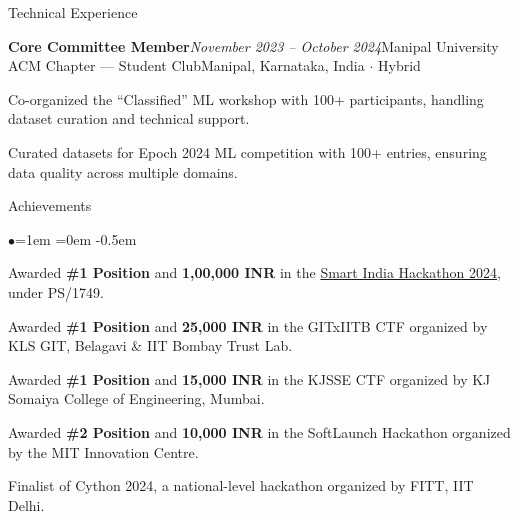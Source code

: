\documentclass{resume} %
\begin{document}
\begin{rSection}{Technical Experience}
\begin{rSubsection}{\bf Core Committee Member}{\em November 2023 -- October 2024}{Manipal University ACM Chapter --- Student Club}{Manipal, Karnataka, India $\cdot$ Hybrid}
\item Co-organized the ``Classified'' ML workshop with 100+ participants, handling dataset curation and technical support.
\item Curated datasets for Epoch 2024 ML competition with 100+ entries, ensuring data quality across multiple domains.
\end{rSubsection}

\end{rSection}

\begin{rSection}{Achievements}
\begin{list}{$\bullet$}{\leftmargin=1em \itemindent=0em}
\itemsep -0.5em
\item Awarded \textbf{\#1 Position} and \textbf{1,00,000 INR} in the \href{https://www.sih.gov.in/sih2024/sih2024-grand-finale-result}{Smart India Hackathon 2024}, under PS/1749.
\item Awarded \textbf{\#1 Position} and \textbf{25,000 INR} in the GITxIITB CTF organized by KLS GIT, Belagavi \& IIT Bombay Trust Lab.
\item Awarded \textbf{\#1 Position} and \textbf{15,000 INR} in the KJSSE CTF organized by KJ Somaiya College of Engineering, Mumbai.
\item Awarded \textbf{\#2 Position} and \textbf{10,000 INR} in the SoftLaunch Hackathon organized by the MIT Innovation Centre.
\item Finalist of Cython 2024, a national-level hackathon organized by FITT, IIT Delhi.
\end{list}
\end{rSection}
\end{document}
